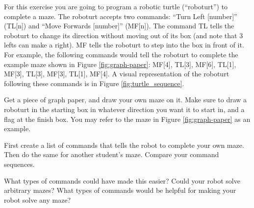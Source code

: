\begin{exercise}

For this exercise you are going to program a robotic turtle (``roboturt'') to complete a maze. The roboturt accepts two commands:  ``Turn Left [number]'' (TL[n]) and ``Move Forwards [number]'' (MF[n]). The command TL tells the roboturt to change its direction without moving out of its box (and note that 3 lefts can make a right). MF tells the roboturt to step into the box in front of it. For example, the following commands would tell the roboturt to complete the example maze shown in Figure \ref{fig:graph-paper}: MF[4], TL[3], MF[6], TL[1], MF[3], TL[3], MF[3], TL[1], MF[4]. A visual representation of the roboturt following these commands is in Figure \ref{fig:turtle_sequence}.

Get a piece of graph paper, and draw your own maze on it. Make sure to draw a roboturt in the starting box in whatever direction you want it to start in, and a flag at the finish box. You may refer to the maze in Figure \ref{fig:graph-paper} as an example. 
  
First create a list of commands that tells the robot to complete your own maze. Then do the same for another student's maze. Compare your command sequences. 

What types of commands could have made this easier? Could your robot solve
arbitrary mazes? What types of commands would be helpful for making your robot
solve any maze?
\end{exercise}


